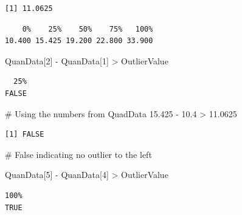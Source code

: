\documentclass[
  letterpaper,
  DIV=11,
  numbers=noendperiod]{scrreprt}
\newenvironment{Shaded}{\begin{snugshade}}{\end{snugshade}}
\newcommand{\CommentTok}[1]{\textcolor[rgb]{0.37,0.37,0.37}{#1}}
\newcommand{\DecValTok}[1]{\textcolor[rgb]{0.68,0.00,0.00}{#1}}
\newcommand{\FloatTok}[1]{\textcolor[rgb]{0.68,0.00,0.00}{#1}}
\newcommand{\FunctionTok}[1]{\textcolor[rgb]{0.28,0.35,0.67}{#1}}
\newcommand{\NormalTok}[1]{\textcolor[rgb]{0.00,0.23,0.31}{#1}}
\newcommand{\OtherTok}[1]{\textcolor[rgb]{0.00,0.23,0.31}{#1}}
\newcommand{\SpecialCharTok}[1]{\textcolor[rgb]{0.37,0.37,0.37}{#1}}
\begin{document}
\begin{verbatim}
[1] 11.0625
\end{verbatim}

\begin{Shaded}
\end{Shaded}

\begin{verbatim}
    0%    25%    50%    75%   100% 
10.400 15.425 19.200 22.800 33.900 
\end{verbatim}

\begin{Shaded}
\begin{Highlighting}[]
\NormalTok{QuanData[}\DecValTok{2}\NormalTok{] }\SpecialCharTok{{-}}\NormalTok{ QuanData[}\DecValTok{1}\NormalTok{] }\SpecialCharTok{\textgreater{}}\NormalTok{ OutlierValue}
\end{Highlighting}
\end{Shaded}

\begin{verbatim}
  25% 
FALSE 
\end{verbatim}

\begin{Shaded}
\begin{Highlighting}[]
\CommentTok{\# Using the numbers from QuadData}
\FloatTok{15.425} \SpecialCharTok{{-}} \FloatTok{10.4} \SpecialCharTok{\textgreater{}} \FloatTok{11.0625}
\end{Highlighting}
\end{Shaded}

\begin{verbatim}
[1] FALSE
\end{verbatim}

\begin{Shaded}
\begin{Highlighting}[]
\CommentTok{\# False indicating no outlier to the left}


\NormalTok{QuanData[}\DecValTok{5}\NormalTok{] }\SpecialCharTok{{-}}\NormalTok{ QuanData[}\DecValTok{4}\NormalTok{] }\SpecialCharTok{\textgreater{}}\NormalTok{ OutlierValue}
\end{Highlighting}
\end{Shaded}

\begin{verbatim}
100% 
TRUE 
\end{verbatim}
\end{document}
